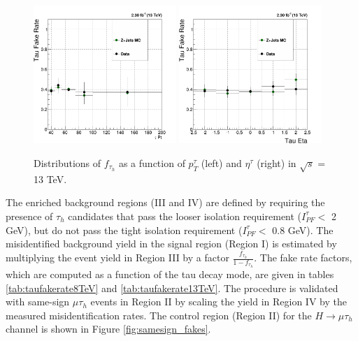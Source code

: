 \documentclass[oneside, letterpaper, oldfontcommands]{memoir}
\begin{document}
\begin{figure}[hbtp]\centering
\includegraphics[width=0.48\textwidth]{tightOldIso_looseOldIso_tPt_fakeRate_13TeV.png}
\includegraphics[width=0.48\textwidth]{tightOldIso_looseOldIso_tEta_fakeRate_13TeV.png}
\caption{Distributions of $f_{\tau_{h}}$ as a function of $ p_{T}^{\tau}$ (left) and $\eta^{\tau}$ (right) in $\sqrt{s}$ = 13 TeV.}
\label{fig:taufakerate13TeV}\end{figure}


\qquad The enriched background regions (III and IV) are defined by requiring the presence of $\tau_{h}$ candidates that pass the looser isolation requirement ($I_{PF}^{\tau} <$ 2 GeV), but do not pass the tight isolation requirement ($I_{PF}^{\tau} <$ 0.8 GeV). The misidentified background yield in the signal region (Region I) is estimated by multiplying the event yield in Region III by a factor $\frac{f_{\tau_{h}}}{1-f_{\tau_{h}}}$. The fake rate factors, which are computed as a function of the tau decay mode, are given in tables \ref{tab:taufakerate8TeV} and \ref{tab:taufakerate13TeV}. The procedure is validated with same-sign $\mu\tau_{h}$ events in Region II by scaling the yield in Region IV by the measured misidentification rates. The control region (Region II) for the $H \rightarrow \mu\tau_{h}$ channel is shown in Figure \ref{fig:samesign_fakes}.
\end{document}
